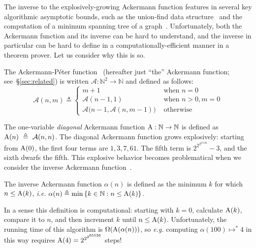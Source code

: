 The inverse to the explosively-growing Ackermann function 
features in several key algorithmic asymptotic
bounds, such as the union-find data structure~\cite{tarjan} and 
the computation of a minimum spanning
tree of a graph~\cite{chazelle}.  Unfortunately, both the Ackermann 
function and its inverse
can be hard to understand, and the inverse in particular can be hard to define in a computationally-efficient manner in a theorem prover.  Let us consider why this
is so.
\begin{defn} \label{defn: ack} 
The Ackermann-P\'eter function~\cite{peter} (hereafter just ``the'' Ackermann function; see~\S\ref{sec:related}) is
written $\mathcal{A} : \mathbb{N}^2 \to \mathbb{N}$ and defined as follows:
\begin{equation}
\label{eq:ackermann}
\mathcal{A}(n, m) \triangleq \begin{cases}
m + 1 & \text{ when } n = 0 \\
\mathcal{A}(n-1, 1) & \text{ when } n > 0, m = 0 \\
\mathcal{A}\big(n-1, \mathcal{A}(n, m-1)\big) & \text{ otherwise}
\end{cases}
\end{equation}
\end{defn}

The one-variable \emph{diagonal} Ackermann function $\text{A} : \mathbb{N} \to \mathbb{N}$ is defined as $\text{A}(n)~\triangleq~\mathcal{A}(n, n)$.	
The diagonal Ackermann function grows explosively: starting from $\text{A}(0)$, the first four terms are $1, 3, 7, 61$.  The fifth term is $2^{2^{2^{65536}}}-3$, and the sixth dwarfs the fifth.
This explosive behavior becomes problematical when we consider
the inverse Ackermann function~\cite{chazelle,tarjan}.
\begin{defn} \label{defn: inv_ack}
The inverse Ackermann function $\alpha(n)$ is defined as the minimum $k$ for which $n \le \text{A}(k)$, \emph{i.e.} $\alpha(n) \triangleq \min\left\{k\in \mathbb{N} : n \le \text{A}(k)\right\}$.
\end{defn}
In a sense this definition is computational: starting with $k=0$, calculate $\text{A}(k)$, compare
it to $n$, and then increment $k$ until $n \le \text{A}(k)$.
Unfortunately, the running time of this algorithm is $\Omega(\text{A}(\alpha(n)))$,
so \emph{e.g.} computing $\alpha(100) \mapsto^{*} 4$ in this way requires
$\text{A}(4) = 2^{2^{2^{65536}}}$ steps!

